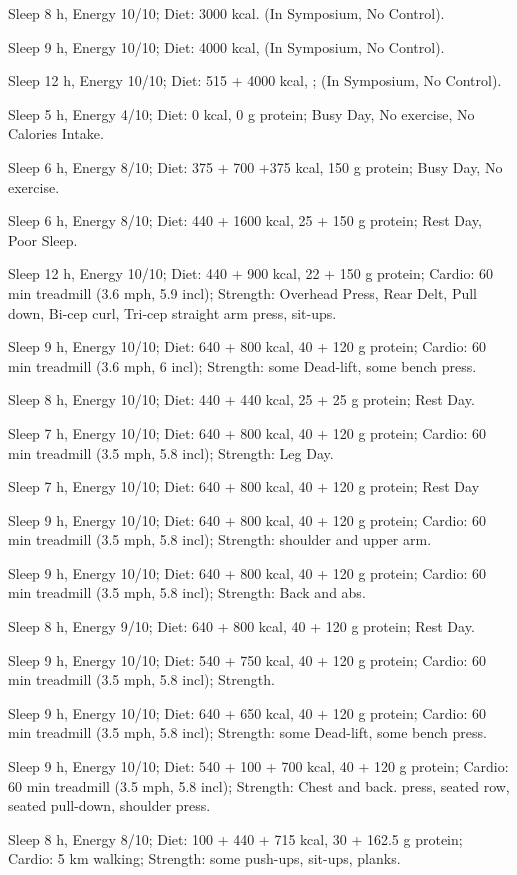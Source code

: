 \item [Oct 18] Sleep 8 h, Energy 10/10; Diet: 3000 kcal. (In Symposium, No Control).
\item [Oct 17] Sleep 9 h, Energy 10/10; Diet: 4000 kcal, (In Symposium, No Control).
\item [Oct 16] Sleep 12 h, Energy 10/10; Diet: 515 + 4000 kcal, ; (In Symposium, No Control).
\item [Oct 15] Sleep 5 h, Energy 4/10; Diet: 0 kcal, 0 g protein; Busy Day, No exercise, No Calories Intake.
\item [Oct 14] Sleep 6 h, Energy 8/10; Diet: 375 + 700 +375 kcal, 150 g protein; Busy Day, No exercise.
\item [Oct 13] Sleep 6 h, Energy 8/10; Diet: 440 + 1600 kcal, 25 + 150 g protein; Rest Day, Poor Sleep.
\item [Oct 12] Sleep 12 h, Energy 10/10; Diet: 440 + 900 kcal, 22 + 150 g protein; Cardio:  60 min treadmill (3.6 mph, 5.9 incl); Strength: Overhead Press, Rear Delt, Pull down, Bi-cep curl, Tri-cep straight arm press, sit-ups.
\item [Oct 11] Sleep 9 h, Energy 10/10; Diet: 640 + 800 kcal, 40 + 120 g protein; Cardio:
60 min treadmill (3.6 mph, 6 incl); Strength: some Dead-lift, some bench press.
\item [Oct 10] Sleep 8 h, Energy 10/10; Diet: 440 + 440 kcal, 25 + 25 g protein; Rest Day.
\item [Oct 9] Sleep 7 h, Energy 10/10; Diet: 640 + 800 kcal, 40 + 120 g protein; Cardio:
60 min treadmill (3.5 mph, 5.8 incl); Strength: Leg Day.
\item [Oct 8] Sleep 7 h, Energy 10/10; Diet: 640 + 800 kcal, 40 + 120 g protein; Rest Day
\item [Oct 7] Sleep 9 h, Energy 10/10; Diet: 640 + 800 kcal, 40 + 120 g protein; Cardio:
60 min treadmill (3.5 mph, 5.8 incl); Strength: shoulder and upper arm.
\item [Oct 6] Sleep 9 h, Energy 10/10; Diet: 640 + 800 kcal, 40 + 120 g protein; Cardio:
60 min treadmill (3.5 mph, 5.8 incl); Strength: Back and abs.
\item [Oct 5] Sleep 8 h, Energy 9/10; Diet: 640 + 800 kcal, 40 + 120 g protein; Rest Day.
\item [Oct 4] Sleep 9 h, Energy 10/10; Diet: 540 + 750 kcal, 40 + 120 g protein; Cardio:
60 min treadmill (3.5 mph, 5.8 incl); Strength.
\item [Oct 3] Sleep 9 h, Energy 10/10; Diet: 640 + 650 kcal, 40 + 120 g protein; Cardio:
60 min treadmill (3.5 mph, 5.8 incl); Strength: some Dead-lift, some bench press.
\item [Oct 2] Sleep 9 h, Energy 10/10; Diet: 540 + 100 + 700 kcal, 40 + 120 g protein; Cardio:
60 min treadmill (3.5 mph, 5.8 incl); Strength: Chest and back.
press, seated row, seated pull-down, shoulder press.
\item [Oct 1] Sleep 8 h, Energy 8/10; Diet: 100 + 440 + 715 kcal, 30 + 162.5 g protein; Cardio: 5 km walking; Strength: some push-ups, sit-ups, planks.